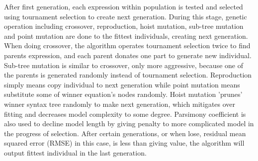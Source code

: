 \documentclass[11pt,a4paper]{article}
\begin{document}
After first generation, each expression within population is tested and selected using tournament selection \citep{Brad1995} to create next generation. During this stage, genetic operation including crossover, reproduction, hoist mutation, sub-tree mutation and point mutation are done to the fittest individuals, creating next generation. When doing crossover, the algorithm operates tournament selection twice to find parents expression, and each parent donates one part to generate new individual. Sub-tree mutation is similar to crossover, only more aggressive, because one of the parents is generated randomly instead of tournament selection. Reproduction simply means copy individual to next generation while point mutation means substitute some of winner equation's nodes randomly. Hoist mutation 'prunes' winner syntax tree randomly to make next generation, which mitigates over fitting and decreases model complexity to some degree. Parsimony coefficient is also used to decline model length by giving penalty to more complicated model in the progress of selection. After certain generations, or when lose, residual mean squared error (RMSE) in this case, is less than giving value, the algorithm will output fittest individual in the last generation. 
\end{document}
